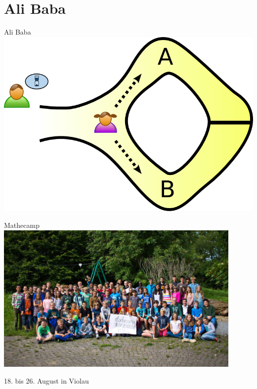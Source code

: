 \documentclass[12pt,compress,ngerman,utf8,t]{beamer}
\newcommand{\redheart}{\scalebox{1.2}{\textcolor{mypurple}{$\varheartsuit$}}}
\begin{document}
\section{Ali Baba}

\begin{frame}{Ali Baba}
  \centering
  \includegraphics[height=0.8\textheight]{alibaba1}
\end{frame}


\appendix

\begin{frame}{Mathecamp}
  \centering
  \includegraphics[width=0.9\textwidth]{mathecamp-gruppenfoto}
  \medskip

  \redheart{} 18. bis 26. August in Violau \redheart{}
\end{frame}
\end{document}

